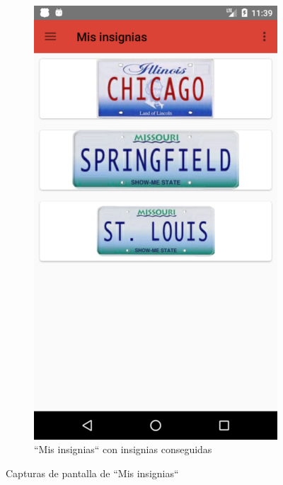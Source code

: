 \documentclass[twoside]{report}
\begin{document}
\begin{figure}[H]
\begin{center}
\begin{subfigure}[t]{.3\linewidth}
		\includegraphics[scale=0.25]{images/userguide/8.png}
		\caption{“Mis insignias“ con insignias conseguidas}
	\end{subfigure}
\caption{Capturas de pantalla de “Mis insignias“}
\end{center}
\end{figure}
\end{document}
